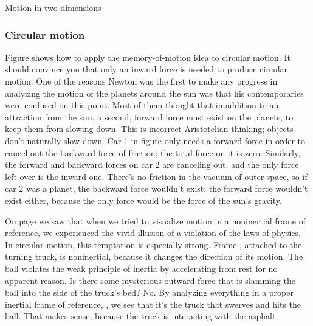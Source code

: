 \begin{envsubsection}{Motion in two dimensions}
\subsubsection{Circular motion}
Figure  shows how to apply the memory-of-motion idea to circular motion. It
should convince you that only an inward force is needed to produce circular motion.
One of the reasons Newton was the first to make any progress in analyzing the motion of
the planets around the sun was that his contemporaries were confused on this point. Most
of them thought that in addition to an attraction from the sun, a second, forward force
must exist on the planets, to keep them from slowing down. This is incorrect Aristotelian
thinking; objects don't naturally slow down. Car 1 in figure  only
needs a forward force in order to cancel out the backward force of friction; the total force on
it is zero. Similarly, the forward and backward forces on car 2 are canceling out, and the
only force left over is the inward one. There's no friction in the vacuum of outer space,
so if car 2 was a planet, the backward force wouldn't exist; the forward force wouldn't
exist either, because the only force would be the force of the sun's gravity.

%

On page \pageref{pickuptrucklinear} we saw that when we tried to visualize motion in
a noninertial frame of reference, we experienced the vivid illusion of a violation of
the laws of physics. In circular motion, this temptation is especially strong.
Frame , attached to the turning truck, is noninertial, because 
it changes the direction of its motion. The ball violates the weak principle of inertia
by accelerating from rest for no apparent reason. Is there some mysterious outward force
that is slamming the ball into the side of the truck's bed? No. By analyzing everything in
a proper inertial frame of reference, , we see that it's
the truck that swerves and hits the ball. That makes sense, because the truck is interacting
with the asphalt.


\end{envsubsection}

